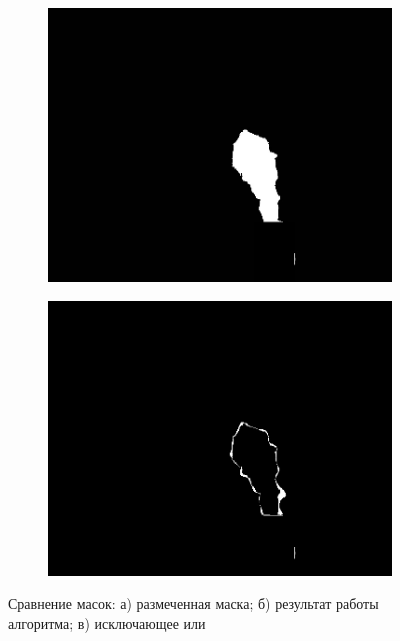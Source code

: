 \documentclass[14pt, a4paper]{extreport}
\begin{document}
\begin{figure}[h!]
\begin{subfigure}{.32\textwidth}
			\includegraphics[width = \textwidth]{image/chapter_3/examples/mask/240}
			\caption{}
		\end{subfigure}
		\hspace{0.1cm}
		\begin{subfigure}{.32\textwidth}
			\centering
			\includegraphics[width = \textwidth]{image/chapter_3/examples/mask_dif/240}
			\caption{}
		\end{subfigure}
		\caption{Сравнение масок: а) размеченная маска; б) результат работы алгоритма; в) исключающее или}
		\label{fig:mask_dif}
	\end{figure}
\end{document}
